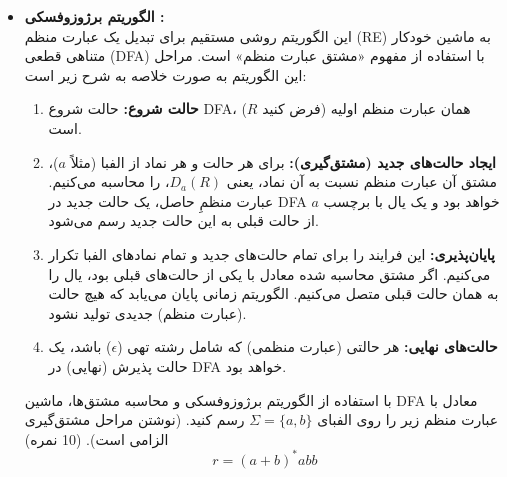 \documentclass[../HW.tex]{subfiles}
\begin{document}
\begin{itemize}

    \item[\textbf{ج)}]
          \textbf{الگوریتم برژوزوفسکی :} \\
          این الگوریتم روشی مستقیم برای تبدیل یک عبارت منظم (RE) به ماشین خودکار متناهی قطعی (DFA) با استفاده از مفهوم «مشتق عبارت منظم» است. مراحل این الگوریتم به صورت خلاصه به شرح زیر است:
          \begin{enumerate}
              \item \textbf{حالت شروع:} حالت شروع DFA، همان عبارت منظم اولیه (فرض کنید $R$) است.
              \item \textbf{ایجاد حالت‌های جدید (مشتق‌گیری):} برای هر حالت و هر نماد از الفبا (مثلاً $a$)، مشتق آن عبارت منظم نسبت به آن نماد، یعنی $D_a(R)$، را محاسبه می‌کنیم. عبارت منظمِ حاصل، یک حالت جدید در DFA خواهد بود و یک یال با برچسب $a$ از حالت قبلی به این حالت جدید رسم می‌شود.
              \item \textbf{پایان‌پذیری:} این فرایند را برای تمام حالت‌های جدید و تمام نمادهای الفبا تکرار می‌کنیم. اگر مشتق محاسبه شده معادل با یکی از حالت‌های قبلی بود، یال را به همان حالت قبلی متصل می‌کنیم. الگوریتم زمانی پایان می‌یابد که هیچ حالت (عبارت منظم) جدیدی تولید نشود.
              \item \textbf{حالت‌های نهایی:} هر حالتی (عبارت منظمی) که شامل رشته تهی ($\epsilon$) باشد، یک حالت پذیرش (نهایی) در DFA خواهد بود.
          \end{enumerate}

          با استفاده از الگوریتم برژوزوفسکی و محاسبه مشتق‌ها، ماشین DFA معادل با عبارت منظم زیر را روی الفبای $\Sigma = \{a, b\}$ رسم کنید. (نوشتن مراحل مشتق‌گیری الزامی است). (10 نمره)
          $$r = (a+b)^*abb$$

\end{itemize}

\ifcompileanswers\solution
\end{document}
